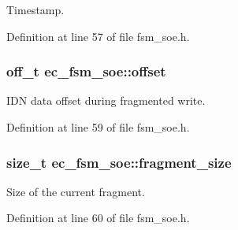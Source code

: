 Timestamp. 



Definition at line 57 of file fsm\-\_\-soe.\-h.

\subsubsection[{offset}]{\setlength{\rightskip}{0pt plus 5cm}off\-\_\-t ec\-\_\-fsm\-\_\-soe\-::offset}\label{structec__fsm__soe_a2e2bdcd1fdb5d507480e0c29a97ce7d0}


I\-D\-N data offset during fragmented write. 



Definition at line 59 of file fsm\-\_\-soe.\-h.

\subsubsection[{fragment\-\_\-size}]{\setlength{\rightskip}{0pt plus 5cm}size\-\_\-t ec\-\_\-fsm\-\_\-soe\-::fragment\-\_\-size}\label{structec__fsm__soe_ae3f6c643ecacae3364064dc9f466c95a}


Size of the current fragment. 



Definition at line 60 of file fsm\-\_\-soe.\-h.

